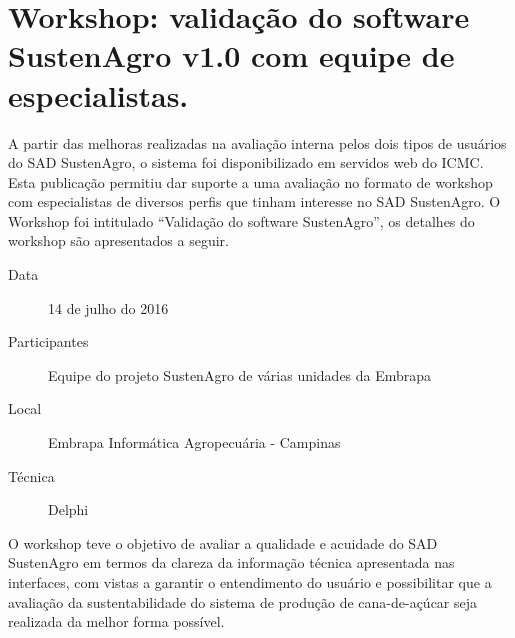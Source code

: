 \setlist[itemize]{}
%

\section{Workshop\foreignlanguage{brazil}{: validação do software SustenAgro
v1.0 com equipe de especialistas.}}

%
A partir das melhoras realizadas na avaliação interna pelos dois tipos
de usuários do SAD SustenAgro, o sistema foi disponibilizado em servidos
web do ICMC. Esta publicação permitiu dar suporte a uma avaliação
no formato de \foreignlanguage{english}{workshop} com especialistas
de diversos perfis que tinham interesse no SAD SustenAgro. O \foreignlanguage{english}{Workshop}
foi intitulado ``Validação do software SustenAgro'', os detalhes
do \foreignlanguage{english}{workshop} são apresentados a seguir.
\begin{description}
\item [{Data}] 14 de julho do 2016
\item [{Participantes}] Equipe do projeto SustenAgro de várias unidades
da Embrapa
\item [{Local}] Embrapa Informática Agropecuária - Campinas
\item [{Técnica}] Delphi
\end{description}
O \foreignlanguage{english}{workshop} teve o objetivo de avaliar a
qualidade e acuidade do SAD SustenAgro em termos da clareza da informação
técnica apresentada nas interfaces, com vistas a garantir o entendimento
do usuário e possibilitar que a avaliação da sustentabilidade do sistema
de produção de cana-de-açúcar seja realizada da melhor forma possível. 

